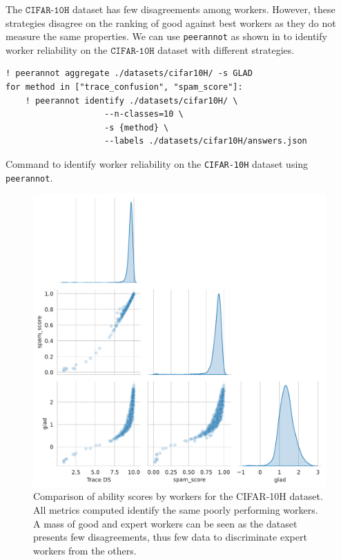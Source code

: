 The $\texttt{CIFAR-10H}$ dataset has few disagreements among workers.
However, these strategies disagree on the ranking of good against best workers as they do not measure the same properties.
We can use \texttt{peerannot} as shown in  to identify worker reliability on the $\texttt{CIFAR-10H}$ dataset with different strategies.

\begin{listing}[H]
    \begin{verbatim}
! peerannot aggregate ./datasets/cifar10H/ -s GLAD
for method in ["trace_confusion", "spam_score"]:
    ! peerannot identify ./datasets/cifar10H/ \
                    --n-classes=10 \
                    -s {method} \
                    --labels ./datasets/cifar10H/answers.json
\end{verbatim}
\caption{Command to identify worker reliability on the \texttt{CIFAR-10H} dataset using \texttt{peerannot}.}
\label{lst:peeranot_identify_c10h_workers}
\end{listing}

\begin{figure}[tbh]
    \centering
    \includegraphics[width=.8\textwidth]{./images_peerannot/fig-abilitiescifarh-output-1.pdf}
    \caption{Comparison of ability scores by workers for the CIFAR-10H dataset. All metrics computed identify the same poorly performing workers. A mass of good and expert workers can be seen as the dataset presents few disagreements, thus few data to discriminate expert workers from the others.}
    \label{fig:abilitiescifarh}
\end{figure}

